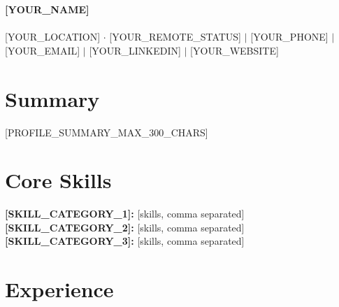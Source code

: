 \documentclass[10pt,letterpaper]{article}
\begin{document}
{\fontsize{20}{22}\selectfont\bfseries [YOUR_NAME]}\\[2pt]
{\fontsize{11}{13}}\\[3pt]
[YOUR_LOCATION] $\cdot$ [YOUR_REMOTE_STATUS] $\mid$ [YOUR_PHONE] $\mid$ [YOUR_EMAIL] $\mid$ [YOUR_LINKEDIN] $\mid$ [YOUR_WEBSITE]

\section*{Summary}
[PROFILE_SUMMARY_MAX_300_CHARS]

\section*{Core Skills}
\textbf{[SKILL_CATEGORY_1]:} [skills, comma separated]\\
\textbf{[SKILL_CATEGORY_2]:} [skills, comma separated]\\
\textbf{[SKILL_CATEGORY_3]:} [skills, comma separated]

\section*{Experience}
\end{document}
